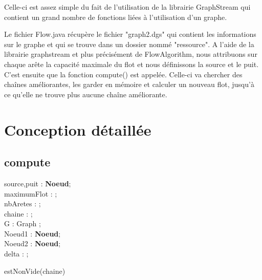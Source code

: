\documentclass{article}
\begin{document}
Celle-ci est assez simple du fait de l'utilisation de la librairie GraphStream qui contient un grand nombre de fonctions liées à l’utilisation d’un graphe.\newline

Le fichier Flow.java récupère le fichier "graph2.dgs" qui contient les informations sur le graphe et qui se trouve dans un dossier nommé "ressource". A l'aide de la librairie graphstream et plus précisément de FlowAlgorithm, nous attribuons sur chaque arête la capacité maximale du flot et nous définissons la source et le puit. C'est ensuite que la fonction compute() est appelée. Celle-ci va chercher des chaînes améliorantes, les garder en mémoire et calculer un nouveau flot, jusqu'à ce qu'elle ne trouve plus aucune chaîne améliorante.

\section{Conception détaillée}

\subsection{compute}
\newcommand{\noeud}{\textbf{\motclefNoeud}}
\newcommand{\motclefNoeud}[0]{Noeud}
\newcommand{\arete}{\textbf{\motclefArete}}
\newcommand{\motclefArete}[0]{arete}
\begin{algorithme}
    {}
    {
        source,puit : \noeud ; \\
        maximumFlot : \entier ; \\
        nbAretes : \entier ; \\
        chaine : \tableauUneDimension{nbAretes}{de }{\arete} ; \\
        G : Graph ; \\ 
        Noeud1 : \noeud ; \\ 
        Noeud2 : \noeud ; \\
        delta : \reel ;

    }
    {
        \repeter
        {
        }
        {estNonVide(chaine)}

    }
\end{algorithme}
\end{document}
